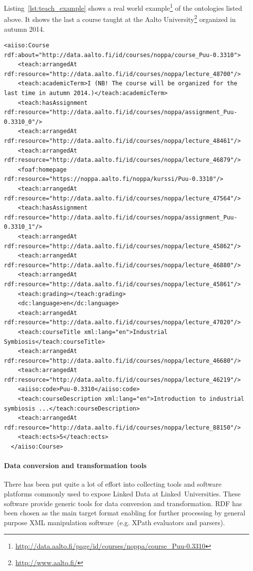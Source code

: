 \documentclass{article}
\begin{document}
Listing~\ref{lst:teach_example} shows a real world example\footnote{\url{http://data.aalto.fi/page/id/courses/noppa/course_Puu-0.3310}} of the ontologies listed above. 
It shows the last a course taught at the Aalto University\footnote{\url{http://www.aalto.fi/}} organized in autumn 2014. 
\begin{lstlisting}[caption={RDF/XML representation of an educational course for industrial symbiosis and industrial ecology concepts taught at the Aalto University using ontologies proposed at Linked Universities},label={lst:teach_example}]
  <aiiso:Course rdf:about="http://data.aalto.fi/id/courses/noppa/course_Puu-0.3310">
    <teach:arrangedAt rdf:resource="http://data.aalto.fi/id/courses/noppa/lecture_48700"/>
    <teach:academicTerm>I (NB! The course will be organized for the last time in autumn 2014.)</teach:academicTerm>
    <teach:hasAssignment rdf:resource="http://data.aalto.fi/id/courses/noppa/assignment_Puu-0.3310_0"/>
    <teach:arrangedAt rdf:resource="http://data.aalto.fi/id/courses/noppa/lecture_48461"/>
    <teach:arrangedAt rdf:resource="http://data.aalto.fi/id/courses/noppa/lecture_46879"/>
    <foaf:homepage rdf:resource="https://noppa.aalto.fi/noppa/kurssi/Puu-0.3310"/>
    <teach:arrangedAt rdf:resource="http://data.aalto.fi/id/courses/noppa/lecture_47564"/>
    <teach:hasAssignment rdf:resource="http://data.aalto.fi/id/courses/noppa/assignment_Puu-0.3310_1"/>
    <teach:arrangedAt rdf:resource="http://data.aalto.fi/id/courses/noppa/lecture_45862"/>
    <teach:arrangedAt rdf:resource="http://data.aalto.fi/id/courses/noppa/lecture_46880"/>
    <teach:arrangedAt rdf:resource="http://data.aalto.fi/id/courses/noppa/lecture_45861"/>
    <teach:grading></teach:grading>
    <dc:language>en</dc:language>
    <teach:arrangedAt rdf:resource="http://data.aalto.fi/id/courses/noppa/lecture_47020"/>
    <teach:courseTitle xml:lang="en">Industrial Symbiosis</teach:courseTitle>
    <teach:arrangedAt rdf:resource="http://data.aalto.fi/id/courses/noppa/lecture_46680"/>
    <teach:arrangedAt rdf:resource="http://data.aalto.fi/id/courses/noppa/lecture_46219"/>
    <aiiso:code>Puu-0.3310</aiiso:code>
    <teach:courseDescription xml:lang="en">Introduction to industrial symbiosis ...</teach:courseDescription>
    <teach:arrangedAt rdf:resource="http://data.aalto.fi/id/courses/noppa/lecture_88150"/>
    <teach:ects>5</teach:ects>
  </aiiso:Course>
\end{lstlisting}

\paragraph{Data conversion and transformation tools}
There has been put quite a lot of effort into collecting tools and software platforms commonly used to expose Linked Data at Linked~Universities. 
These software provide generic tools for data conversion and transformation. RDF has been chosen as the main target format enabling for further processing by general purpose XML manipulation software~(e.g. XPath evaluators and parsers).
\end{document}
